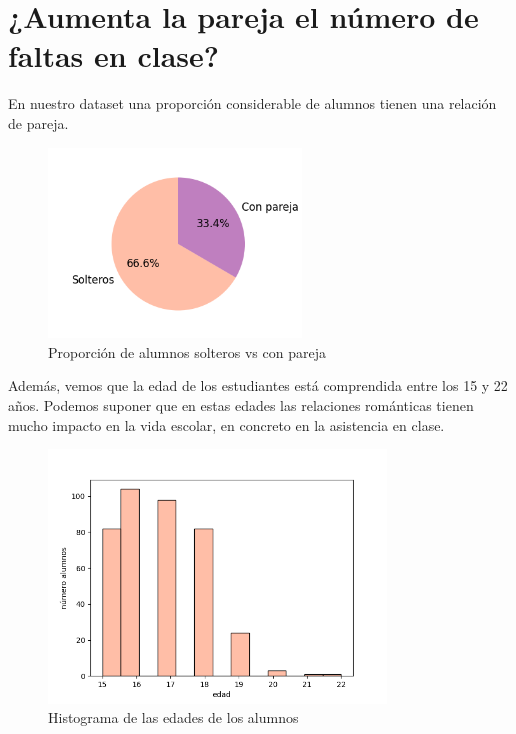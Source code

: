 \section{¿Aumenta la pareja el número de faltas en clase?}
En nuestro dataset una proporción considerable de alumnos tienen una relación de pareja.

\begin{figure}[H]
    \centering
    \includegraphics[width=0.6\textwidth]{./figures/proporcion-solteros-pareja.png}
    \caption{Proporción de alumnos solteros vs con pareja}
    \label{fig:prop-solteros}
\end{figure}

\pagebreak

Además, vemos que la edad de los estudiantes está comprendida entre los 15 y 22 años. Podemos suponer que en estas edades las relaciones románticas tienen mucho impacto en la vida escolar, en concreto en la asistencia en clase.
\begin{figure}[H]
    \centering
    \includegraphics[width=0.8\textwidth]{./figures/edad-alumnos.png}
    \caption{Histograma de las edades de los alumnos}
    \label{fig:hist-edad}
\end{figure}

